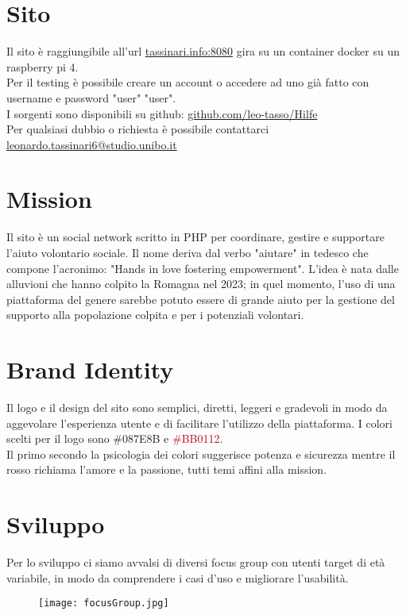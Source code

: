 \section{Sito}
Il sito è raggiungibile all'url \href{http://tassinari.info:8080}{tassinari.info:8080} gira su un container docker su un raspberry pi 4.\\
Per il testing è possibile creare un account o accedere ad uno già fatto con username e password "user" "user".\\
I sorgenti sono disponibili su github: \href{https://github.com/leo-tasso/Hilfe}{github.com/leo-tasso/Hilfe}\\
Per qualsiasi dubbio o richiesta è possibile contattarci \href{mailto:leonardo.tassinari6@studio.unibo.it}{leonardo.tassinari6@studio.unibo.it}
\section{Mission}
Il sito è un social network scritto in PHP per coordinare, gestire e supportare l'aiuto volontario sociale. Il nome deriva dal verbo "aiutare" in tedesco che compone l'acronimo: "Hands in love fostering empowerment".
L'idea è nata dalle alluvioni che hanno colpito la Romagna nel 2023; in quel momento, l'uso di una piattaforma del genere sarebbe potuto essere di grande aiuto per la gestione del supporto alla popolazione colpita e per i potenziali volontari.
\section{Brand Identity}
Il logo e il design del sito sono semplici, diretti, leggeri e gradevoli in modo da aggevolare l'esperienza utente e di facilitare l'utilizzo della piattaforma.
I colori scelti per il logo sono \textcolor[HTML]{087E8B}{\#087E8B} e \textcolor[HTML]{BB0112}{\#BB0112}.\\
Il primo secondo la psicologia dei colori suggerisce potenza e sicurezza mentre il rosso richiama l'amore e la passione, tutti temi affini alla mission.
\section{Sviluppo}
Per lo sviluppo ci siamo avvalsi di diversi focus group con utenti target di età variabile, in modo da comprendere i casi d'uso e migliorare l'usabilità.
\begin{figure}[H]
    \centering
    \texttt{[image: focusGroup.jpg]}
\end{figure}
